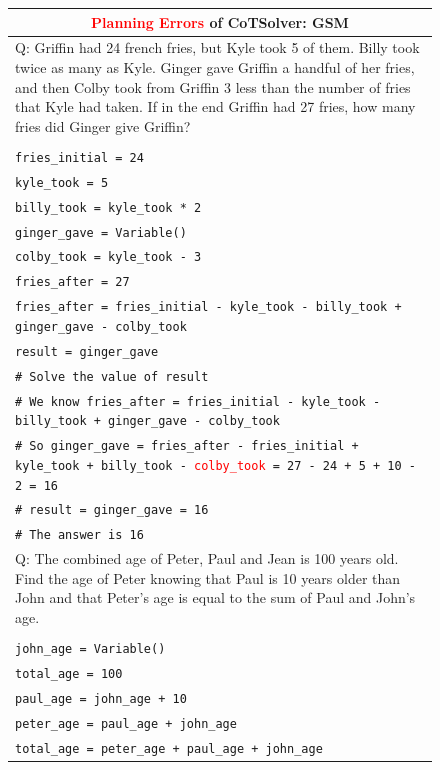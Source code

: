 \documentclass{article}
\theoremstyle{definition}
\newcommand{\gsm}{\textsc{GSM}}
\begin{document}
\begin{figure}[h]
    \footnotesize
    \centering
    \begin{tabularx}{\linewidth}{X}
    \toprule
         \multicolumn{1}{c}{\bf \textcolor{red}{Planning Errors} of {\sc CoTSolver}: \gsm{}} \\
         \midrule
Q: Griffin had 24 french fries, but Kyle took 5 of them. Billy took twice as many as Kyle. Ginger gave Griffin a handful of her fries, and then Colby took from Griffin 3 less than the number of fries that Kyle had taken. If in the end Griffin had 27 fries, how many fries did Ginger give Griffin? \\
\\
 \tt   fries\_initial = 24 \\
  \tt  kyle\_took = 5 \\
  \tt  billy\_took = kyle\_took * 2 \\
 \tt   ginger\_gave = Variable() \\
  \tt  colby\_took = kyle\_took - 3 \\
  \tt  fries\_after = 27 \\
  \tt  fries\_after = fries\_initial - kyle\_took - billy\_took + ginger\_gave - colby\_took \\
  \tt  result = ginger\_gave \\
  \tt  \# Solve the value of result \\
  \tt  \# We know fries\_after = fries\_initial - kyle\_took - billy\_took + ginger\_gave - colby\_took  \\
  \tt  \# So ginger\_gave = fries\_after - fries\_initial + kyle\_took + billy\_took - \textcolor{red}{colby\_took} = 27 - 24 + 5 + 10 - 2 = 16 \\
   \tt \# result = ginger\_gave = 16 \\
   \tt \# The answer is 16\\
\midrule
    Q: The combined age of Peter, Paul and Jean is 100 years old. Find the age of Peter knowing that Paul is 10 years older than John and that Peter’s age is equal to the sum of Paul and John's age. \\
    \\
  \tt  john\_age = Variable() \\
  \tt  total\_age = 100 \\
   \tt paul\_age = john\_age + 10 \\
   \tt peter\_age = paul\_age + john\_age \\
   \tt total\_age = peter\_age + paul\_age + john\_age \\

\end{tabularx}
\end{figure}
\end{document}
